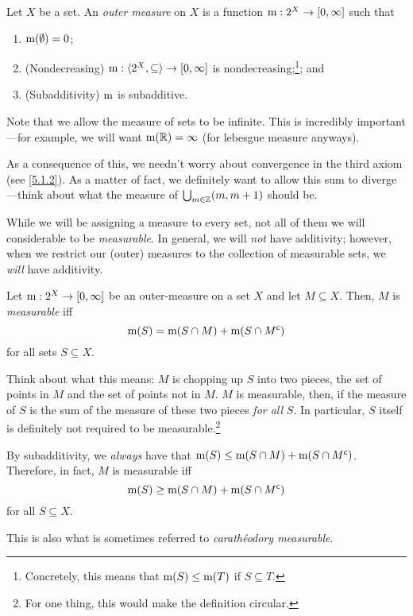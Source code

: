 \begin{dfn}\label{OuterMeasure}
Let $X$ be a set.  An \emph{outer measure} on $X$ is a function $\mathrm{m} :2^X\rightarrow [0,\infty ]$ such that
\begin{enumerate}
\item $\mathrm{m} (\emptyset )=0$;
\item (Nondecreasing)\label{Measure.Monotonicity} $\mathrm{m} :\langle2^X,\subseteq\rangle\rightarrow [0,\infty ]$ is nondecreasing;\footnote{Concretely, this means that $\mathrm{m} (S)\leq \mathrm{m} (T)$ if $S\subseteq T$.}; and
\item (Subadditivity) $\mathrm{m}$ is subadditive.
\end{enumerate}
\begin{rmk}
Note that we allow the measure of sets to be infinite.  This is incredibly important---for example, we will want $\mathrm{m} (\mathbb{R} )=\infty$ (for lebesgue measure anyways).
\end{rmk}
\begin{rmk}
As a consequence of this, we needn't worry about convergence in the third axiom (see \eqref{5.1.2}).  As a matter of fact, we definitely want to allow this sum to diverge---think about what the measure of $\bigcup _{m\in \mathbb{Z}}(m,m+1)$ should be.
\end{rmk}
\end{dfn}
While we will be assigning a measure to every set, not all of them we will considerable to be \emph{measurable}.  In general, we will \emph{not} have additivity; however, when we restrict our (outer) measures to the collection of measurable sets, we \emph{will} have additivity.
\begin{dfn}[Measurable]\label{Measurable}
Let $\mathrm{m} :2^X\rightarrow [0,\infty ]$ be an outer-measure on a set $X$ and let $M\subseteq X$.  Then, $M$ is \emph{measurable} iff
\begin{equation}
\mathrm{m} (S)=\mathrm{m} (S\cap M)+\mathrm{m} (S\cap M^{\mathsf{c}})
\end{equation}
for all sets $S\subseteq X$.
\begin{rmk}
Think about what this means:  $M$ is chopping up $S$ into two pieces, the set of points in $M$ and the set of points not in $M$.  $M$ is measurable, then, if the measure of $S$ is the sum of the measure of these two pieces \emph{for all} $S$.  In particular, $S$ itself is definitely not required to be measurable.\footnote{For one thing, this would make the definition circular.}
\end{rmk}
\begin{rmk}
By subadditivity, we \emph{always} have that $\mathrm{m} (S)\leq \mathrm{m} (S\cap M)+\mathrm{m} (S\cap M^{\mathsf{c}})$.  Therefore, in fact, $M$ is measurable iff
\begin{equation}
\mathrm{m} (S)\geq \mathrm{m} (S\cap M)+\mathrm{m} (S\cap M^{\mathsf{c}})
\end{equation}
for all $S\subseteq X$.
\end{rmk}
\begin{rmk}
This is also what is sometimes referred to \emph{carath\'{e}odory measurable}.
\end{rmk}
\end{dfn}
